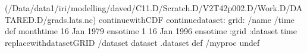 \begin{ingrid}
(/Data/data1/iri/modelling/daved/C11.D/Scratch.D/V2T42p002.D/Work.D/DATARED.D/grads.lats.nc) continuewithCDF
continuedataset: 
grid:
/name /time def
monthtime
16 Jan 1979 ensotime
1
16 Jan 1996 ensotime
:grid
:dataset
time replacewithdatasetGRID
/dataset dataset .dataset def
/myproc undef
\end{ingrid}
